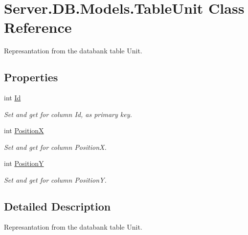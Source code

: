 \hypertarget{classServer_1_1DB_1_1Models_1_1TableUnit}{\section{Server.\-D\-B.\-Models.\-Table\-Unit Class Reference}
\label{classServer_1_1DB_1_1Models_1_1TableUnit}
}


Represantation from the databank table Unit.  


\subsection*{Properties}
\begin{DoxyCompactItemize}
\item 
int \hyperlink{classServer_1_1DB_1_1Models_1_1TableUnit_a6b41f5c204d9a336e057de1ea5bc7602}{Id}
\begin{DoxyCompactList}\small\item\em Set and get for column Id, as primary key. \end{DoxyCompactList}\item 
int \hyperlink{classServer_1_1DB_1_1Models_1_1TableUnit_ac3f6fbba28d575332fb8272acea1ede7}{Position\-X}
\begin{DoxyCompactList}\small\item\em Set and get for column Position\-X. \end{DoxyCompactList}\item 
int \hyperlink{classServer_1_1DB_1_1Models_1_1TableUnit_a9f536f4d39ce82ef7071734b2037fde8}{Position\-Y}
\begin{DoxyCompactList}\small\item\em Set and get for column Position\-Y. \end{DoxyCompactList}\end{DoxyCompactItemize}


\subsection{Detailed Description}
Represantation from the databank table Unit. 



